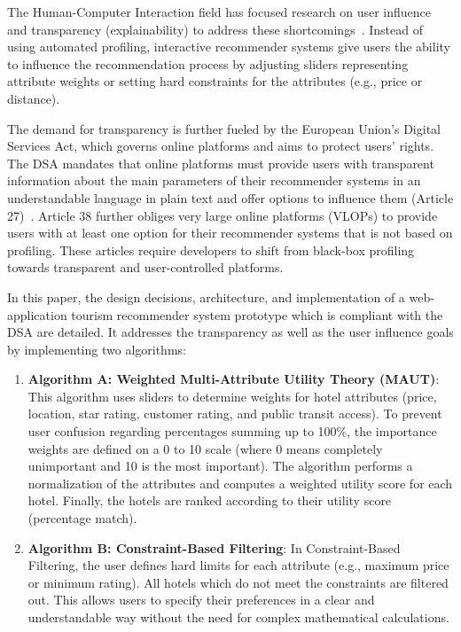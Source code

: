 \documentclass[acmlarge]{acmart}
\begin{document}
The Human-Computer Interaction field has focused research on user influence and transparency (explainability) to address these shortcomings~\cite{knijnenburg2012explaining, tintarev2012evaluating}. Instead of using automated profiling, interactive recommender systems give users the ability to influence the recommendation process by adjusting sliders representing attribute weights or setting hard constraints for the attributes (e.g., price or distance).

The demand for transparency is further fueled by the European Union's Digital Services Act, which governs online platforms and aims to protect users' rights. The DSA mandates that online platforms must provide users with transparent information about the main parameters of their recommender systems in an understandable language in plain text and offer options to influence them (Article 27)~\cite{eudsa2022}. Article 38 further obliges very large online platforms (VLOPs) to provide users with at least one option for their recommender systems that is not based on profiling. These articles require developers to shift from black-box profiling towards transparent and user-controlled platforms.

In this paper, the design decisions, architecture, and implementation of a web-application tourism recommender system prototype which is compliant with the DSA are detailed. It addresses the transparency as well as the user influence goals by implementing two algorithms:
\begin{enumerate}
    \item \textbf{Algorithm A: Weighted Multi-Attribute Utility Theory (MAUT)}:
    This algorithm uses sliders to determine weights for hotel attributes (price, location, star rating, customer rating, and public transit access). To prevent user confusion regarding percentages summing up to 100\%, the importance weights are defined on a 0 to 10 scale (where 0 means completely unimportant and 10 is the most important). The algorithm performs a normalization of the attributes and computes a weighted utility score for each hotel. Finally, the hotels are ranked according to their utility score (percentage match).
    \item \textbf{Algorithm B: Constraint-Based Filtering}: 
    In Constraint-Based Filtering, the user defines hard limits for each attribute (e.g., maximum price or minimum rating). All hotels which do not meet the constraints are filtered out. This allows users to specify their preferences in a clear and understandable way without the need for complex mathematical calculations.
\end{enumerate}
\end{document}
